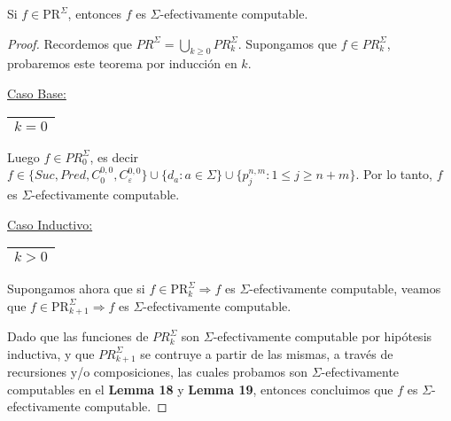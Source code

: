   \begin{theorem}
    \par Si $f \in \mathrm{PR}^{\Sigma}$, entonces $f$ es $\Sigma$-efectivamente computable.
  \end{theorem}
  \begin{proof}
    \par Recordemos que $PR^{\Sigma} = \bigcup\limits_{k \geq 0} PR_{k}^{\Sigma}$. Supongamos que $f \in
    PR_{k}^{\Sigma}$, probaremos este teorema por inducción en $k$.

    \vspace{3mm}
    \underline{Caso Base:} \begin{tabular}{|c|} \hline $k = 0$ \\\hline \end{tabular}

    \par Luego $f \in PR_{0}^{\Sigma}$, es decir $f \in \{Suc, Pred, C_{0}^{0,0}, C_{\varepsilon}^{0,0}\} \cup \{d_{a}:
    a \in \Sigma\} \cup \{p_{j}^{n,m} : 1 \leq j \geq n+m\}$. Por lo tanto, $f$ es $\Sigma$-efectivamente computable.

    \vspace{3mm}
		\underline{Caso Inductivo:} \begin{tabular}{|c|} \hline $k > 0$ \\\hline \end{tabular}

    \par Supongamos ahora que si $f \in \mathrm{PR}_{k}^{\Sigma} \Rightarrow f$ es
    $\Sigma$-efectivamente computable, veamos que $f \in \mathrm{PR}_{k+1}^{\Sigma} \Rightarrow f$ es
    $\Sigma$-efectivamente computable.

    \par Dado que las funciones de $PR_{k}^{\Sigma}$ son $\Sigma$-efectivamente computable por hipótesis inductiva, y
    que $PR_{k+1}^{\Sigma}$ se contruye a partir de las mismas, a través de recursiones y/o composiciones, las cuales
    probamos son $\Sigma$-efectivamente computables en el \textbf{Lemma 18} y \textbf{Lemma 19}, entonces concluimos que
    $f$ es $\Sigma$-efectivamente computable.
  \end{proof}

